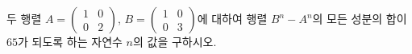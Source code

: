 \hspace*{2mm}\begin{minipage}[t]{\dimexpr\linewidth-2mm\relax}\vspace{0pt}
두 행렬 $A=\begin{pmatrix} 1 & 0 \\ 0 & 2 \end{pmatrix}$, $B=\begin{pmatrix} 1 & 0 \\ 0 & 3 \end{pmatrix}$에 대하여 행렬 $B^n-A^n$의 모든 성분의 합이 $65$가 되도록 하는 자연수 $n$의 값을 구하시오.\end{minipage}
